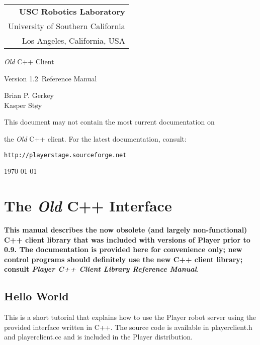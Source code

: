 \documentclass[11pt]{article}
\def\VERSION {1.2}
\def\HOMEPAGE {{\tt http://playerstage.sourceforge.net}}
\begin{document}
\setcounter{page}{0}

\titlepage

\begin{flushright}
\begin{tabular}{r}
{\bf USC Robotics Laboratory}\\
University of Southern California\\
Los Angeles, California, USA\\
\end{tabular}
\end{flushright}

\vspace{5cm}
\centerline{\huge{{\em Old} C++ Client}}
\vspace{0.5cm}
\centerline{\large{Version \VERSION\ Reference Manual}}
\vspace{2cm}

\centerline{\large Brian P. Gerkey\\ Kasper St\o{}y}
\vspace{1cm}

\centerline{This document may not contain the most current documentation on} 
\centerline{the {\em Old} C++ client.  For the latest documentation, consult:}
\centerline{\HOMEPAGE}

\vspace{4cm}

\centerline{\today}

\newpage
\tableofcontents
\newpage

\setcounter{page}{0}
\section{The {\em Old} C++ Interface}
\label{app:oldc++}
{\Large \bf This manual describes the now obsolete (and largely non-functional)
C++ client library that was included with versions of Player prior to 0.9.
The documentation is provided here for convenience only; new control programs
should definitely use the new C++ client library; consult {\em Player C++
Client Library Reference Manual}}.

\subsection{Hello World}

This is a short tutorial that explains how to use the Player robot
 server using the provided interface written in C++. The source
 code is available in playerclient.h and playerclient.cc and is 
included in the Player distribution.
\end{document}
